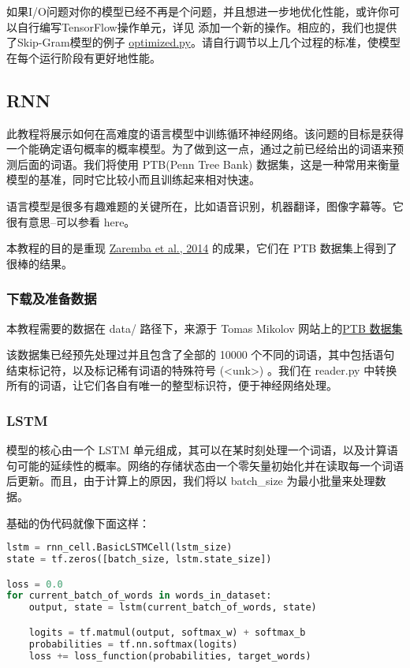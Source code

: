 如果I/O问题对你的模型已经不再是个问题，并且想进一步地优化性能，或许你可以自行编写TensorFlow操作单元，详见 添加一个新的操作。相应的，我们也提供了Skip-Gram模型的例子 \href{https://github.com/bleedingfight/models/tree/master/tutorials/embedding}{optimized.py}。请自行调节以上几个过程的标准，使模型在每个运行阶段有更好地性能。
\subsection{RNN}
此教程将展示如何在高难度的语言模型中训练循环神经网络。该问题的目标是获得一个能确定语句概率的概率模型。为了做到这一点，通过之前已经给出的词语来预测后面的词语。我们将使用 PTB(Penn Tree Bank) 数据集，这是一种常用来衡量模型的基准，同时它比较小而且训练起来相对快速。

语言模型是很多有趣难题的关键所在，比如语音识别，机器翻译，图像字幕等。它很有意思--可以参看 here。

本教程的目的是重现 \href{http://arxiv.org/abs/1409.2329}{Zaremba et al., 2014} 的成果，它们在 PTB 数据集上得到了很棒的结果。
\subsubsection{下载及准备数据}
本教程需要的数据在 data/ 路径下，来源于 Tomas Mikolov 网站上的\href{http://www.fit.vutbr.cz/~imikolov/rnnlm/simple-examples.tg}{PTB 数据集}

该数据集已经预先处理过并且包含了全部的 10000 个不同的词语，其中包括语句结束标记符，以及标记稀有词语的特殊符号 (<unk>) 。我们在 reader.py 中转换所有的词语，让它们各自有唯一的整型标识符，便于神经网络处理。
\subsubsection{LSTM}
模型的核心由一个 LSTM 单元组成，其可以在某时刻处理一个词语，以及计算语句可能的延续性的概率。网络的存储状态由一个零矢量初始化并在读取每一个词语后更新。而且，由于计算上的原因，我们将以 batch\_size 为最小批量来处理数据。

基础的伪代码就像下面这样：
\begin{lstlisting}[language=Python]
lstm = rnn_cell.BasicLSTMCell(lstm_size)
state = tf.zeros([batch_size, lstm.state_size])

loss = 0.0
for current_batch_of_words in words_in_dataset:
    output, state = lstm(current_batch_of_words, state)

    logits = tf.matmul(output, softmax_w) + softmax_b
    probabilities = tf.nn.softmax(logits)
    loss += loss_function(probabilities, target_words)
\end{lstlisting}
